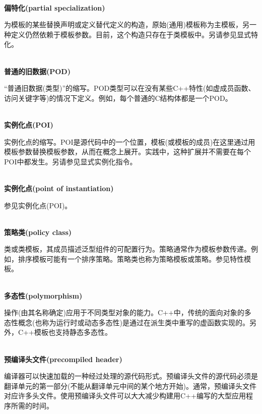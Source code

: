 \hspace*{\fill} \\ %
\noindent
\textbf{偏特化(partial specialization)}

为模板的某些替换声明或定义替代定义的构造，原始(通用)模板称为主模板，另一种定义仍然依赖于模板参数。目前，这个构造只存在于类模板中。另请参见显式特化。

\hspace*{\fill} \\ %
\noindent
\textbf{普通的旧数据(POD)}

“普通旧数据(类型)”的缩写。POD类型可以在没有某些C++特性(如虚成员函数、访问关键字等)的情况下定义。例如，每个普通的C结构体都是一个POD。

\hspace*{\fill} \\ %
\noindent
\textbf{实例化点(POI)}

实例化点的缩写。POI是源代码中的一个位置，模板(或模板的成员)在这里通过用模板参数替换模板参数，从而在概念上展开。实践中，这种扩展并不需要在每个POI中都发生。另请参见显式实例化指令。

\hspace*{\fill} \\ %
\noindent
\textbf{实例化点(point of instantiation)}

参见实例化点(POI)。

\hspace*{\fill} \\ %
\noindent
\textbf{策略类(policy class)}

类或类模板，其成员描述泛型组件的可配置行为。策略通常作为模板参数传递。例如，排序模板可能有一个排序策略。策略类也称为策略模板或策略。参见特性模板。

\hspace*{\fill} \\ %
\noindent
\textbf{多态性(polymorphism)}

操作(由其名称确定)应用于不同类型对象的能力。C++中，传统的面向对象的多态性概念(也称为运行时或动态多态性)是通过在派生类中重写的虚函数实现的。另外，C++模板也支持静态多态性。

\hspace*{\fill} \\ %
\noindent
\textbf{预编译头文件(precompiled header)}

编译器可以快速加载的一种经过处理的源代码形式。预编译头文件的源代码必须是翻译单元的第一部分(不能从翻译单元中间的某个地方开始)。通常，预编译头文件对应许多头文件。使用预编译头文件可以大大减少构建用C++编写的大型应用程序所需的时间。

